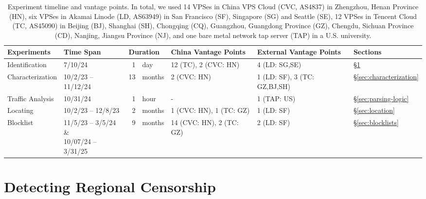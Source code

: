 \documentclass[conference,compsoc]{IEEEtran}
\begin{document}
\begin{table}[t]
  \small
  \centering
  \caption{Experiment timeline and vantage points.
  In total,
  we used
  14 VPSes in China VPS Cloud (CVC, AS4837) in Zhengzhou, Henan Province (HN),
  six VPSes in Akamai Linode (LD, AS63949) in San Francisco (SF), Singapore (SG) and Seattle (SE),
  12 VPSes in Tencent Cloud (TC, AS45090) in
  Beijing (BJ),
  Shanghai (SH),
  Chongqing (CQ),
  Guangzhou, Guangdong Province (GZ),
  Chengdu, Sichuan Province (CD),
  Nanjing, Jiangsu Province (NJ),
  and one bare metal network tap server (TAP) in a U.S. university.
  }
  \begin{tabular}{llr@{~}llll}
    \toprule
    Experiments & Time Span & \multicolumn{2}{l}{Duration}        & China Vantage Points & External Vantage Points & Sections                  \\
    \midrule
    Identification & 7/10/24 & 1 & day & 12 (TC), 2 (CVC: HN) & 4 (LD: SG,SE)  & \S\ref{sec:detection} \\
    Characterization & 10/2/23 -- 11/12/24 & 13 & months & 2 (CVC: HN) & 1 (LD: SF), 3 (TC: GZ,BJ,SH)  & \S\ref{sec:characterization} \\
    Traffic Analysis & 10/31/24 & 1 & hour & - & 1 (TAP: US)& \S\ref{sec:parsing-logic}   \\
    Locating & 10/2/23 -- 12/8/23 & 2 & months & 1 (CVC: HN), 1 (TC: GZ) & 1 (LD: SF) & \S\ref{sec:location}   \\
    Blocklist & \makecell{11/5/23 -- 3/5/24 \& \\ 10/07/24 -- 3/31/25} & 9 & months & 14 (CVC: HN), 2 (TC: GZ) & 2 (LD: SF)& \S\ref{sec:blocklists}   \\
    \bottomrule
  \end{tabular}
  \label{table:exp-summary}
\end{table}

\section{Detecting Regional Censorship}
\label{sec:detection}
\end{document}
